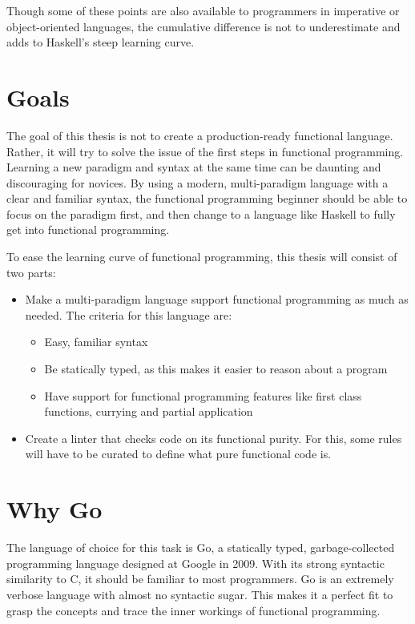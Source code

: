 Though some of these points are also available to programmers in imperative or object-oriented languages, the cumulative difference
is not to underestimate and adds to Haskell's steep learning curve.


\section{Goals}

The goal of this thesis is not to create a production-ready functional language. Rather, it will
try to solve the issue of the first steps in functional programming.
Learning a new paradigm and syntax at the same time can be daunting and discouraging for novices.
By using a modern, multi-paradigm language with a clear
and familiar syntax, the functional programming beginner should be able to focus on the paradigm
first, and then change to a language like Haskell to fully get into functional programming.

To ease the learning curve of functional programming, this thesis will consist of two parts:

\begin{itemize}
    \item Make a multi-paradigm language support functional programming as much as needed.
        The criteria for this language are:
    \begin{itemize}
        \item Easy, familiar syntax
        \item Be statically typed, as this makes it easier to reason about a program
        \item Have support for functional programming features like first class functions, currying
            and partial application
    \end{itemize}
    \item Create a linter that checks code on its functional purity. For this, some rules will have
        to be curated to define what pure functional code is.
\end{itemize}

\section{Why Go}

The language of choice for this task is Go, a statically typed, garbage-collected programming language
designed at Google in 2009\cite{golang-publish}. With its strong syntactic similarity to C, it should
be familiar to most programmers.
Go is an extremely verbose language with almost no syntactic sugar. This makes it a perfect fit to
grasp the concepts and trace the inner workings of functional programming.

